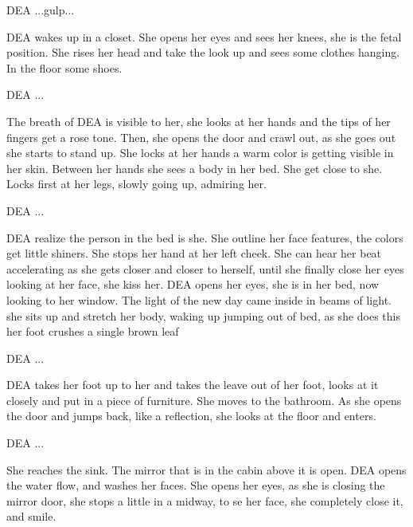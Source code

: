 \documentclass{screenplay}[2012/06/30]
\begin{document}
\begin{dialogue}{DEA}
    ...gulp...
\end{dialogue}
\intercut
{}
DEA wakes up in a closet. She opens her eyes and sees her knees, she is the fetal position.
She rises her head and take the look up and 
sees some clothes hanging. In the floor some shoes.
\begin{dialogue}[Exhalates]{DEA}
    ...
\end{dialogue}
The breath of DEA is visible to her, she looks at her hands and
the tips of her fingers get a rose tone. Then, she opens the door and
crawl out, as she goes out she starts to stand up. She locks at her hands
a warm color is getting visible in her skin. Between her hands she sees
a body in her bed. She get close to she. Locks first at her legs, slowly 
going up, admiring her.
\begin{dialogue}{DEA}
    ...
\end{dialogue}
DEA realize the person in the bed is she. 
She outline her face features, the colors get little shiners. She stops her hand at her left cheek.
She can hear her beat accelerating as she 
gets closer and closer to herself, until she finally close her eyes looking at her face,
she kiss her.
\intercut
{}
DEA opens her eyes, she is in her bed, now looking to her window.
The light of the new day came inside in beams of light. she sits up and stretch her body,
waking up jumping out of bed, as she does this her foot crushes a single brown leaf
\begin{dialogue}{DEA}
    ...
\end{dialogue}
DEA takes her foot up to her and takes the leave out of her foot, looks at it
closely and put in a piece of furniture. She moves to the bathroom. As she opens the door
and jumps back, like a reflection, she looks at the floor and enters.
\begin{dialogue}[Laughfing]{DEA}
    ...
\end{dialogue}
She reaches the sink. The mirror that is in the cabin above it is open.
DEA opens the water flow, and washes her faces. She opens her eyes, as she is closing the mirror door,
she stops a little in a midway, to se her face, she completely close it, and smile.
\end{document}
